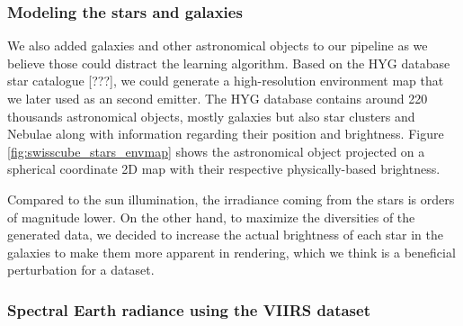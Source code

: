 



\subsubsection{Modeling the stars and galaxies}

We also added galaxies and other astronomical objects to our pipeline as we believe those could distract the learning algorithm. Based on the HYG database star catalogue [???], we could generate a high-resolution environment map that we later used as an second emitter. The HYG database contains around 220 thousands astronomical objects, mostly galaxies but also star clusters and Nebulae along with information regarding their position and brightness. Figure \ref{fig:swisscube_stars_envmap} shows the astronomical object projected on a spherical coordinate 2D map with their respective physically-based brightness.

Compared to the sun illumination, the irradiance coming from the stars is orders of magnitude lower. On the other hand, to maximize the diversities of the generated data, we decided to increase the actual brightness of each star in the galaxies to make them more apparent in rendering, which we think is a beneficial perturbation for a dataset.





\subsubsection{Spectral Earth radiance using the VIIRS dataset}

